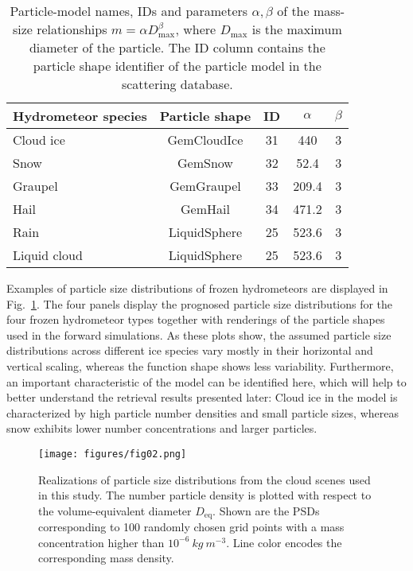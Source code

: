 \documentclass[journal abbreviation, manuscript]{copernicus}
\begin{document}
\begin{table}
  \centering
  \caption{Particle-model names, IDs and parameters $\alpha, \beta$ of the
    mass-size relationships $m = \alpha D_\text{max}^\beta$, where
    $D_\text{max}$ is the maximum diameter of the particle. The ID column
    contains the particle shape identifier of the particle model in the
    \citet{eriksson18} scattering database.}
  \label{tab:species_parameters}
  \begin{tabular}{l|c|c|c|c}
    Hydrometeor species & Particle shape & ID & $\alpha$ & $\beta$ \\
    \hline
    Cloud ice    & GemCloudIce  & 31 & 440   & 3 \\
    Snow         & GemSnow      & 32 & 52.4  & 3 \\
    Graupel      & GemGraupel   & 33 & 209.4 & 3 \\
    Hail         & GemHail      & 34 & 471.2 & 3 \\
    Rain         & LiquidSphere & 25 & 523.6 & 3 \\
    Liquid cloud & LiquidSphere & 25 & 523.6 & 3 \\
  \end{tabular}
\end{table}

Examples of particle size distributions of frozen hydrometeors are displayed in
Fig.~\ref{fig:gem_psds}. The four panels display the prognosed particle size
distributions for the four frozen hydrometeor types together with renderings of
the particle shapes used in the forward simulations. As these plots show, the
assumed particle size distributions across different ice species vary mostly in
their horizontal and vertical scaling, whereas the function shape shows less
variability. Furthermore, an important characteristic of the model can be
identified here, which will help to better understand the retrieval results
presented later: Cloud ice in the model is characterized by high particle number
densities and small particle sizes, whereas snow exhibits lower number
concentrations and larger particles.


\begin{figure}[h!]
\centering \texttt{[image: figures/fig02.png]}
\caption{Realizations of particle size distributions from the cloud scenes used
  in this study. The number particle density is plotted with respect to the
  volume-equivalent diameter $D_\text{eq}$. Shown are the PSDs corresponding to
  100 randomly chosen grid points with a mass concentration higher than
  $10^{-6}\ \unit{kg\ m^{-3}}$. Line color encodes the corresponding mass density.}
\label{fig:gem_psds}
\end{figure}
\end{document}
